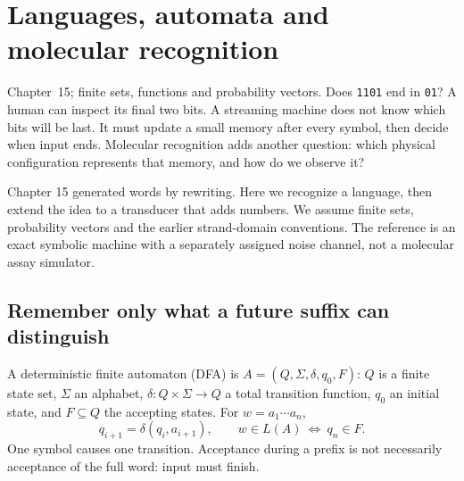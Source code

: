 \chapter{Languages, automata and molecular recognition}
{Chapter~15; finite sets, functions and probability vectors.}
Does \texttt{1101} end in \texttt{01}? A human can inspect its final two bits.
A streaming machine does not know which bits will be last. It must update a
small memory after every symbol, then decide when input ends. Molecular
recognition adds another question: which physical configuration represents that
memory, and how do we observe it?

Chapter 15 generated words by rewriting. Here we recognize a language, then
extend the idea to a transducer that adds numbers. We assume finite sets,
probability vectors and the earlier strand-domain conventions.
The reference is an exact symbolic machine with a separately assigned noise
channel, not a molecular assay simulator.

\section{Remember only what a future suffix can distinguish}
A deterministic finite automaton (DFA) is $A=(Q,\Sigma,\delta,q_0,F)$:
$Q$ is a finite state set, $\Sigma$ an alphabet,
$\delta:Q\times\Sigma\to Q$ a total transition function, $q_0$ an initial
state, and $F\subseteq Q$ the accepting states. For $w=a_1\cdots a_n$,
\begin{equation}
 q_{i+1}=\delta(q_i,a_{i+1}),\qquad
 w\in L(A)\ \Longleftrightarrow\ q_n\in F.
 \label{eq:dfa}
\end{equation}
One symbol causes one transition. Acceptance during a prefix is not necessarily
acceptance of the full word: input must finish.

